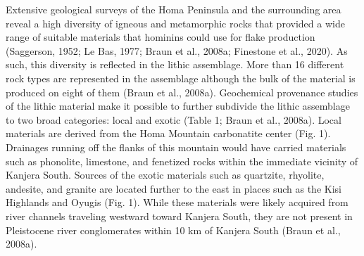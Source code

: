 \documentclass[]{elsarticle} %
\begin{document}
Extensive geological surveys of the Homa Peninsula and the surrounding
area reveal a high diversity of igneous and metamorphic rocks that
provided a wide range of suitable materials that hominins could use for
flake production (\hspace{0pt}Saggerson, 1952\hspace{0pt};
\hspace{0pt}Le Bas, 1977\hspace{0pt}; \hspace{0pt}Braun et al.,
2008a\hspace{0pt}; \hspace{0pt}Finestone et al., 2020\hspace{0pt}). As
such, this diversity is reflected in the lithic assemblage. More than 16
different rock types are represented in the assemblage although the bulk
of the material is produced on eight of them (\hspace{0pt}Braun et al.,
2008a\hspace{0pt}). Geochemical provenance studies of the lithic
material make it possible to further subdivide the lithic assemblage to
two broad categories: local and exotic (\hspace{0pt}Table 1\hspace{0pt};
\hspace{0pt}Braun et al., 2008a\hspace{0pt}). Local materials are
derived from the Homa Mountain carbonatite center (\hspace{0pt}Fig.
1\hspace{0pt}). Drainages running off the flanks of this mountain would
have carried materials such as phonolite, limestone, and fenetized rocks
within the immediate vicinity of Kanjera South. Sources of the exotic
materials such as quartzite, rhyolite, andesite, and granite are located
further to the east in places such as the Kisi Highlands and Oyugis
(\hspace{0pt}Fig. 1\hspace{0pt}). While these materials were likely
acquired from river channels traveling westward toward Kanjera South,
they are not present in Pleistocene river conglomerates within 10 km of
Kanjera South (\hspace{0pt}Braun et al., 2008a\hspace{0pt}).
\end{document}
